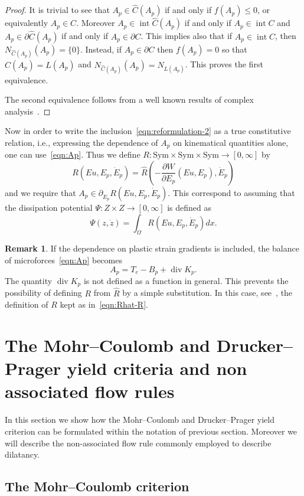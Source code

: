 \documentclass[a4paper,10pt,oneside]{amsbook}
\numberwithin{section}{chapter}
\numberwithin{equation}{chapter}
\theoremstyle{definition}
\newtheorem{rmk}[prop]{Remark}
\DeclareMathOperator{\inter}{int}
\DeclareMathOperator{\diver}{div}
\newcommand{\dind}[2]{\frac{\partial #1}{\partial #2}}
\begin{document}
\begin{proof}
It is trivial to see that $A_p\in\hat{C}(A_p)$ if and only if $f(A_p)\le 0$, or equivalently $A_p\in C$. Moreover $A_p\in\inter\hat{C}(A_p)$ if and only if $A_p\in\inter C$ and $A_p\in\partial\hat{C}(A_p)$ if and only if $A_p\in\partial C$. This implies also that if $A_p\in\inter C$, then $N_{\hat{C}(A_p)}(A_p)=\{0\}$. Instead, if $A_p\in\partial C$ then $f(A_p)=0$ so that $\hat{C}(A_p)=L(A_p)$ and $N_{\hat{C}(A_p)}(A_p)=N_{L(A_p)}$. This proves the first equivalence.

The second equivalence follows from a well known results of complex analysis~\cite[Corollary 5.2]{ekeland-temam}.
\end{proof}
Now in order to write the inclusion~\eqref{eqn:reformulation-2} as a true constitutive relation, i.e., expressing the dependence of $A_p$ on kinematical quantities alone, one can use~\eqref{eqn:Ap}. Thus we define $R\colon\text{Sym}\times\text{Sym}\times\text{Sym}\to[0,\infty]$ by
\begin{equation}
\label{eqn:Rhat-R}
R(Eu,E_p,\dot E_p)=\hat{R}\left(-\dind{W}{E_p}(Eu,E_p),\dot E_p\right)
\end{equation}
and we require that $A_p\in\partial_{\dot E_p}R(Eu,E_p,\dot E_p)$. This correspond to assuming that the dissipation potential $\Psi\colon Z\times Z\to[0,\infty]$ is defined as
\[
\Psi(z,\dot z)=\int_\Omega R(Eu,E_p,\dot E_p)dx.
\]
\begin{rmk}
If the dependence on plastic strain gradients is included, the balance of microforces~\eqref{eqn:Ap} becomes
\[
A_p=T_e-B_p+\diver K_p.
\]
The quantity $\diver K_p$ is not defined as a function in general. This prevents the possibility of defining $R$ from $\hat R$ by a simple substitution. In this case, see~\cite{StefanelliVikelis2024}, the definition of $R$ kept as in~\eqref{eqn:Rhat-R}.
\end{rmk}

\section{The Mohr--Coulomb and Drucker--Prager yield criteria and non associated flow rules}
\label{sec:yield-criteria}

In this section we show how the Mohr--Coulomb and Drucker--Prager yield criterion can be formulated within the notation of previous section. Moreover we will describe the non-associated flow rule commonly employed to describe dilatancy.

\subsection{The Mohr--Coulomb criterion}
\end{document}
